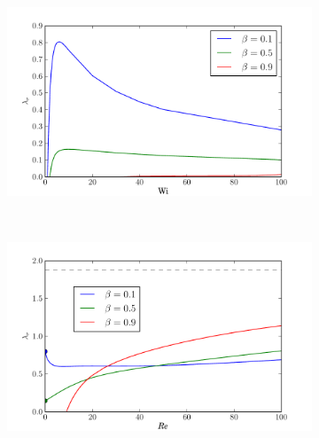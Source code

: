 \documentclass{jfm}
\begin{document}
\begin{figure} 
    \centering 
    \begin{subfigure}[b]{0.48\textwidth} 
	\centering
	\includegraphics[width=\textwidth]{KH_low_Re_vary_Wi} 
	\caption{}
	\label{fig:KH_purely_elastic} 
    \end{subfigure} ~
    \begin{subfigure}[b]{0.48\textwidth} 
	\centering
	\includegraphics[width=\textwidth]{KH_low_Wi_vary_Re} 
	\caption{}
	\label{fig:KH_reduce_Re} 
    \end{subfigure}


\end{figure}
\end{document}
